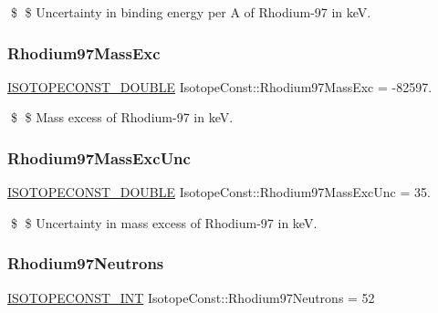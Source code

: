 \$ \$ Uncertainty in binding energy per A of Rhodium-\/97 in keV. \mbox{\label{group___isotope_const-_rhodium-_rh97_gabbe376077072d3a7a137f182d171c79d}} 
\subsubsection{\texorpdfstring{Rhodium97\+Mass\+Exc}{Rhodium97MassExc}}
{\footnotesize\ttfamily \mbox{\hyperlink{group___isotope_const-_macros_ga8f45a7272ce02c0b4c65c44636ed719a}{I\+S\+O\+T\+O\+P\+E\+C\+O\+N\+S\+T\+\_\+\+D\+O\+U\+B\+LE}} Isotope\+Const\+::\+Rhodium97\+Mass\+Exc = -\/82597.}

\$ \$ Mass excess of Rhodium-\/97 in keV. \mbox{\label{group___isotope_const-_rhodium-_rh97_ga0791beb138415fcafb57c4cf0e31f212}} 
\subsubsection{\texorpdfstring{Rhodium97\+Mass\+Exc\+Unc}{Rhodium97MassExcUnc}}
{\footnotesize\ttfamily \mbox{\hyperlink{group___isotope_const-_macros_ga8f45a7272ce02c0b4c65c44636ed719a}{I\+S\+O\+T\+O\+P\+E\+C\+O\+N\+S\+T\+\_\+\+D\+O\+U\+B\+LE}} Isotope\+Const\+::\+Rhodium97\+Mass\+Exc\+Unc = 35.}

\$ \$ Uncertainty in mass excess of Rhodium-\/97 in keV. \mbox{\label{group___isotope_const-_rhodium-_rh97_ga537a38492d819ebee9b1197b847e6e70}} 
\subsubsection{\texorpdfstring{Rhodium97\+Neutrons}{Rhodium97Neutrons}}
{\footnotesize\ttfamily \mbox{\hyperlink{group___isotope_const-_macros_ga5f18360b3e99483a35c32d789e62621c}{I\+S\+O\+T\+O\+P\+E\+C\+O\+N\+S\+T\+\_\+\+I\+NT}} Isotope\+Const\+::\+Rhodium97\+Neutrons = 52}

